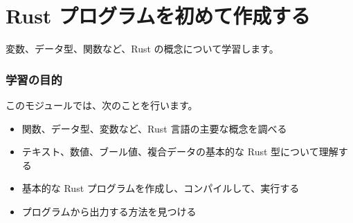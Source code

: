 \section{Rust プログラムを初めて作成する}

変数、データ型、関数など、Rust の概念について学習します。

\subsubsection{学習の目的}
このモジュールでは、次のことを行います。

\begin{itemize}
\item 関数、データ型、変数など、Rust 言語の主要な概念を調べる
\item テキスト、数値、ブール値、複合データの基本的な Rust 型について理解する
\item 基本的な Rust プログラムを作成し、コンパイルして、実行する
\item プログラムから出力する方法を見つける
\end{itemize}

